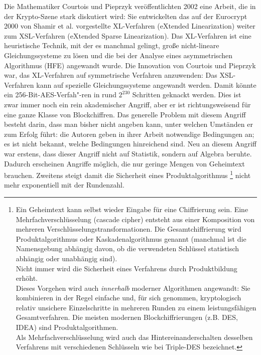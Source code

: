 Die Mathematiker Courtois und Pieprzyk \cite{Courtois2002} veröffentlichten 
2002 eine Arbeit, die in der Krypto-Szene stark diskutiert wird: Sie 
entwickelten das auf der Eurocrypt 2000 von Shamir et al. vorgestellte 
XL-Verfahren (eXtended Linearization) weiter zum XSL-Verfahren 
(eXtended Sparse Linearization). Das XL-Verfahren ist eine heuristische 
Technik, mit der es manchmal gelingt, große nicht-lineare Gleichungssysteme 
zu lösen und die bei der Analyse eines asymmetrischen Algorithmus (HFE) 
angewandt wurde.  Die Innovation von Courtois und Pieprzyk war, das 
XL-Verfahren auf symmetrische Verfahren anzuwenden: Das XSL-Verfahren kann
auf spezielle Gleichungssysteme angewandt werden. Damit könnte ein 
256-Bit-AES-Verfah"-ren in rund $2^{230}$ Schritten geknackt werden. Dies ist 
zwar immer noch ein rein akademischer Angriff, aber er ist richtungsweisend
für eine ganze Klasse von Blockchiffren. Das generelle Problem mit diesem
Angriff besteht darin, dass man bisher nicht angeben kann, unter welchen
Umständen er zum Erfolg führt: die Autoren geben in ihrer Arbeit notwendige
Bedingungen an; es ist nicht bekannt, welche Bedingungen hinreichend sind.
Neu an diesem Angriff war erstens, dass dieser Angriff nicht auf Statistik,
sondern auf Algebra beruhte. Dadurch erscheinen Angriffe möglich, die nur
geringe Mengen von Geheimtext brauchen. Zweitens steigt damit die Sicherheit
eines Produktalgorithmus%
%
\footnote{%
Ein Geheimtext kann selbst wieder Eingabe für eine Chiffrierung sein. Eine
Mehrfachverschlüsselung (cascade cipher)
entsteht aus einer Komposition von mehreren Verschlüsselungstransformationen.
Die Gesamtchiffrierung wird Produktalgorithmus oder Kaskadenalgorithmus
genannt (manchmal ist die Namensgebung abhängig davon, ob die verwendeten
Schlüssel statistisch abhängig oder unabhängig sind).\\
Nicht immer wird die Sicherheit eines Verfahrens durch Produktbildung 
erhöht.\\
Dieses Vorgehen wird auch {\em innerhalb} moderner Algorithmen angewandt:
Sie kombinieren in der Regel einfache und, für sich genommen, kryptologisch
relativ unsichere Einzelschritte in mehreren Runden zu einem leistungsfähigen
Gesamtverfahren. Die meisten modernen Blockchiffrierungen (z.B. DES, IDEA)
sind Produktalgorithmen.\\
Als Mehrfachverschlüsselung wird auch das Hintereinanderschalten desselben
Verfahrens mit verschiedenen Schlüsseln wie bei Triple-DES bezeichnet.
}
nicht mehr exponentiell mit der Rundenzahl.


